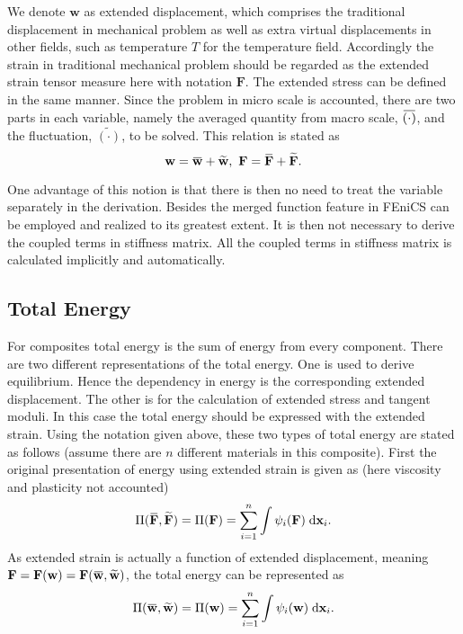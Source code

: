 \documentclass[10pt,a4paper]{scrreprt}
\newcommand{\myd}{\;\mathrm{d}}
\newcommand{\overbar}[1]{\mkern 1.5mu\overline{\mkern-1.5mu#1\mkern-1.5mu}\mkern 1.5mu}
\begin{document}
We denote $\mathbf{w}$ as extended displacement, which comprises the traditional displacement in mechanical problem as well as extra virtual displacements in other fields, such as temperature $T$ for the temperature field. Accordingly the strain in traditional mechanical problem should be regarded as the extended strain tensor measure here with notation $\mathbf{F}$. The extended stress can be defined in the same manner. Since the problem in micro scale is accounted, there are two parts in each variable, namely the averaged quantity from macro scale, $\overbar{(\cdot)}$, and the fluctuation, $\widetilde{(\cdot)}$, to be solved. This relation is stated as
\begin{equation}
\label{eq: decomp}
\mathbf{w} = \overbar{\mathbf{w}} + \widetilde{\mathbf{w}}, \ \mathbf{F} = \overbar{\mathbf{F}} + \widetilde{\mathbf{F}}.
\end{equation}

One advantage of this notion is that there is then no need to treat the variable separately in the derivation. Besides the merged function feature in FEniCS can be employed and realized to its greatest extent. It is then not necessary to derive the coupled terms in stiffness matrix. All the coupled terms in stiffness matrix is calculated implicitly and automatically.

\subsection{Total Energy}
For composites total energy is the sum of energy from every component. There are two different representations of the total energy. One is used to derive equilibrium. Hence the dependency in energy is the corresponding extended displacement. The other is for the calculation of extended stress and tangent moduli. In this case the total energy should be expressed with the extended strain. Using the notation given above, these two types of total energy are stated as follows (assume there are $n$ different materials in this composite). First the original presentation of energy using extended strain is given as (here viscosity and plasticity not accounted) 
\begin{equation}
\label{eq: strain energy}
\Pi(\overbar{\mathbf{F}}, \widetilde{\mathbf{F}}) = \Pi(\mathbf{F}) = \sum^{n}_{i=1} \int \psi_{i}(\mathbf{F}) \myd{\mathbf{x}_{i}}.
\end{equation}
As extended strain is actually a function of extended displacement, meaning $\mathbf{F}=\mathbf{F}(\mathbf{w})=\mathbf{F}(\overbar{\mathbf{w}}, \widetilde{\mathbf{w}})$, the total energy can be represented as
\begin{equation}
\label{eq: disp energy}
\Pi(\overbar{\mathbf{w}}, \widetilde{\mathbf{w}}) = \Pi(\mathbf{w}) = \sum^{n}_{i=1} \int \psi_{i}(\mathbf{w}) \myd{\mathbf{x}_{i}}.
\end{equation} 
\end{document}
